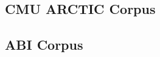 \documentclass
[
    a4paper,
    twoside,
    12pt,
]
{report}
\begin{document}
\hypertarget{cmu-arctic-corpus}{%
\subsection{CMU ARCTIC Corpus}\label{cmu-arctic-corpus}}

\hypertarget{abi-corpus}{%
\subsection{ABI Corpus}\label{abi-corpus}}
\cleardoublepage
% 
% 

\printbibliography
\end{document}
